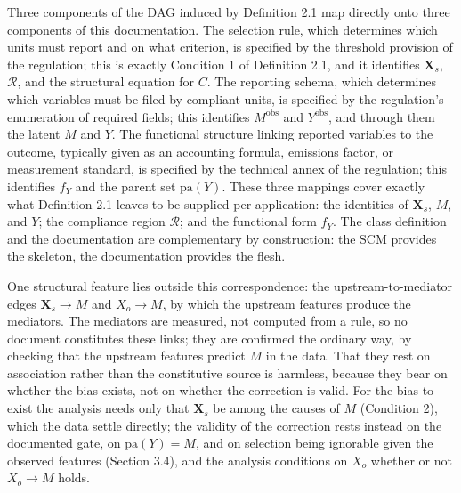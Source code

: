 Three components of the DAG induced by Definition 2.1 map directly onto three components of this documentation. The selection rule, which determines which units must report and on what criterion, is specified by the threshold provision of the regulation; this is exactly Condition 1 of Definition 2.1, and it identifies $\mathbf{X}_s$, $\mathcal{R}$, and the structural equation for $C$. The reporting schema, which determines which variables must be filed by compliant units, is specified by the regulation's enumeration of required fields; this identifies $M^{\text{obs}}$ and $Y^{\text{obs}}$, and through them the latent $M$ and $Y$. The functional structure linking reported variables to the outcome, typically given as an accounting formula, emissions factor, or measurement standard, is specified by the technical annex of the regulation; this identifies $f_Y$ and the parent set $\mathrm{pa}(Y)$. These three mappings cover exactly what Definition 2.1 leaves to be supplied per application: the identities of $\mathbf{X}_s$, $M$, and $Y$; the compliance region $\mathcal{R}$; and the functional form $f_Y$. The class definition and the documentation are complementary by construction: the SCM provides the skeleton, the documentation provides the flesh.

One structural feature lies outside this correspondence: the upstream-to-mediator edges $\mathbf{X}_s \to M$ and $X_o \to M$, by which the upstream features produce the mediators. The mediators are measured, not computed from a rule, so no document constitutes these links; they are confirmed the ordinary way, by checking that the upstream features predict $M$ in the data. That they rest on association rather than the constitutive source is harmless, because they bear on whether the bias exists, not on whether the correction is valid. For the bias to exist the analysis needs only that $\mathbf{X}_s$ be among the causes of $M$ (Condition 2), which the data settle directly; the validity of the correction rests instead on the documented gate, on $\mathrm{pa}(Y) = M$, and on selection being ignorable given the observed features (Section 3.4), and the analysis conditions on $X_o$ whether or not $X_o \to M$ holds.

